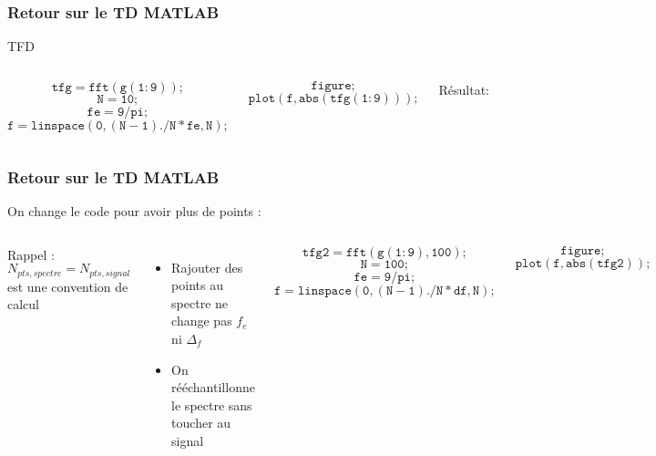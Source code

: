 \documentclass{beamer}
\begin{document}
\begin{frame}
\frametitle{Retour sur le TD MATLAB}
TFD
\begin{columns}

\column{60mm}
\[\mathtt{tfg = fft(g(1:9));}\]
\[\mathtt{N = 10;}\]
\vspace{0.3cm}
\[\mathtt{fe = 9/pi;}\]
\[\mathtt{f = linspace(0,(N-1)./N*fe,N);}\]

\[\mathtt{figure;} \]
\[\mathtt{plot(f,abs(tfg(1:9)));}\]

\column{60mm}
Résultat:\\
\vspace{0.2cm}
\begin{center}
\end{center}
\end{columns}
\end{frame}

\begin{frame}
\frametitle{Retour sur le TD MATLAB}
On change le code pour avoir plus de points :\\
\vspace{0.2cm}
\begin{columns}

\column{60mm}
Rappel : $N_{pts,spectre} = N_{pts,signal}$ est une convention de calcul \\
\vspace{0.3cm}
\begin{itemize}
\item Rajouter des points au spectre ne change pas $f_e$ ni $\Delta_f$
\vspace{0.2cm}
\item On rééchantillonne le spectre sans toucher au signal
\end{itemize}
 

\column{60mm}
\[\mathtt{tfg2 = fft(g(1:9),100);}\]
\[\mathtt{N = 100;}\]
\vspace{0.3cm}
\[\mathtt{fe = 9/pi;}\]
\[\mathtt{f = linspace(0,(N-1)./N*df,N);}\]

\[\mathtt{figure;} \]
\[\mathtt{plot(f,abs(tfg2));}\]

\end{columns}
\end{frame}
\end{document}
